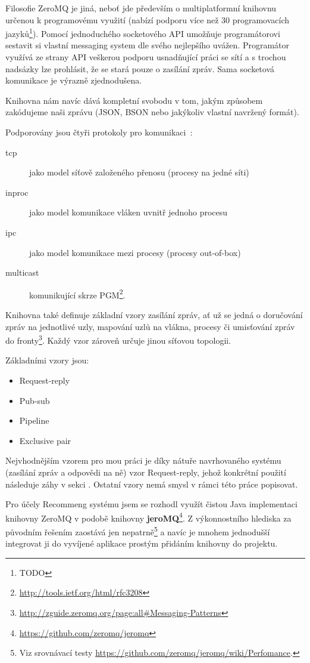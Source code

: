 \documentclass[thesis=M,czech]{FITthesis}[2014/05/07]
\begin{document}
Filosofie ZeroMQ je jiná, neboť jde především o multiplatformní knihovnu určenou k programovému využití (nabízí podporu více než 30 programovacích jazyků\footnote{TODO}). Pomocí jednoduchého socketového API umožňuje programátorovi sestavit si vlastní messaging system dle svého nejlepšího uvážen. Programátor využívá ze strany API veškerou podporu usnadňující práci se sítí a s trochou nadsázky lze prohlásit, že se stará pouze o zasílání zpráv. Sama socketová komunikace je výrazně zjednodušena.

Knihovna nám navíc dává kompletní svobodu v tom, jakým způsobem zakódujeme naši zprávu (JSON, BSON nebo jakýkoliv vlastní navržený formát).

Podporovány jsou čtyři protokoly pro komunikaci~\cite{zeromq1}:

\begin{description}
	\item[tcp] jako model síťově založeného přenosu (procesy na jedné síti)
	\item[inproc] jako model komunikace vláken uvnitř jednoho procesu
	\item[ipc] jako model komunikace mezi procesy (procesy out-of-box)
	\item[multicast]	komunikující skrze PGM\footnote{\url{http://tools.ietf.org/html/rfc3208}}.
\end{description}

Knihovna také definuje základní vzory zasílání zpráv, ať už se jedná o doručování zpráv na jednotlivé uzly, mapování uzlů na vlákna, procesy či umisťování zpráv do fronty\footnote{\url{http://zguide.zeromq.org/page:all\#Messaging-Patterns}}. Každý vzor zároveň určuje jinou síťovou topologii.

Základními vzory jsou:

\begin{itemize}
	\item Request-reply
	\item Pub-sub
	\item Pipeline		
	\item Exclusive pair
\end{itemize}

Nejvhodnějším vzorem pro mou práci je díky nátuře navrhovaného systému (zasílání zpráv a odpovědi na ně) vzor Request-reply, jehož konkrétní použití následuje záhy v sekci . Ostatní vzory nemá smysl v rámci této práce popisovat.

Pro účely Recommeng systému jsem se rozhodl využít čistou Java implementaci knihovny ZeroMQ v podobě knihovny \textbf{jeroMQ}\footnote{\url{https://github.com/zeromq/jeromq}}. Z výkonnostního hlediska za původním řešením zaostává jen nepatrně\footnote{Viz srovnávací testy \url{https://github.com/zeromq/jeromq/wiki/Perfomance}.} a navíc je mnohem jednodušší integrovat ji do vyvíjené aplikace prostým přidáním knihovny do projektu.
\end{document}
